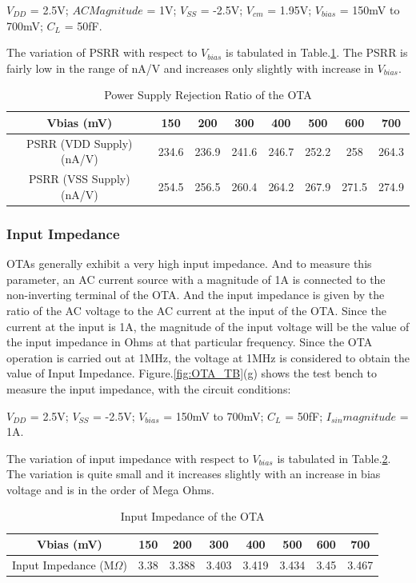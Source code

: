 $V_{DD}$ = 2.5V; $AC Magnitude$ = 1V; $V_{SS}$ = -2.5V; $V_{cm}$ = 1.95V; $V_{bias}$ = 150mV to 700mV; $C_{L}$ = 50fF.

The variation of PSRR with respect to $V_{bias}$ is tabulated in Table.\ref{tab:OTA_PSRR}. The PSRR is fairly low in the range of nA/V and increases only slightly with increase in $V_{bias}$.

\begin{table} [H]
\centering
\begin{tabular}{@{}cccccccc@{}}
\toprule
Vbias (mV)					& 150			& 200			& 300			& 400			& 500			& 600			& 700 \\ \midrule
PSRR (VDD Supply) (nA/V)			& 234.6		& 236.9		& 241.6		& 246.7 	& 252.2		& 258		& 264.3 \\
PSRR (VSS Supply) (nA/V)			& 254.5		& 256.5		& 260.4		& 264.2		& 267.9		& 271.5		& 274.9 \\
\bottomrule
\end{tabular}
\caption{Power Supply Rejection Ratio of the OTA}
\label{tab:OTA_PSRR}
\end{table}

\subsubsection{Input Impedance}
OTAs generally exhibit a very high input impedance. And to measure this parameter, an AC current source with a magnitude of 1A is connected to the non-inverting terminal of the OTA. And the input impedance is given by the ratio of the AC voltage to the AC current at the input of the OTA. Since the current at the input is 1A, the magnitude of the input voltage will be the value of the input impedance in Ohms at that particular frequency. Since the OTA operation is carried out at 1MHz, the voltage at 1MHz is considered to obtain the value of Input Impedance. Figure.\ref{fig:OTA_TB}(g) shows the test bench to measure the input impedance, with the circuit conditions:

$V_{DD}$ = 2.5V; $V_{SS}$ = -2.5V; $V_{bias}$ = 150mV to 700mV; $C_{L}$ = 50fF; $I_{sin} magnitude$ = 1A. 

The variation of input impedance with respect to $V_{bias}$ is tabulated in Table.\ref{tab:OTA_ZIN}. The variation is quite small and it increases slightly with an increase in bias voltage and is in the order of Mega Ohms.

\begin{table} [H]
\centering
\begin{tabular}{@{}cccccccc@{}}
\toprule
Vbias (mV)					& 150		& 200			& 300			& 400			& 500			& 600			& 700 \\ \midrule
Input Impedance (M$\Omega$)			& 3.38		& 3.388		& 3.403		& 3.419		& 3.434		& 3.45		& 3.467 \\
\bottomrule
\end{tabular}
\caption{Input Impedance of the OTA}
\label{tab:OTA_ZIN}
\end{table}

